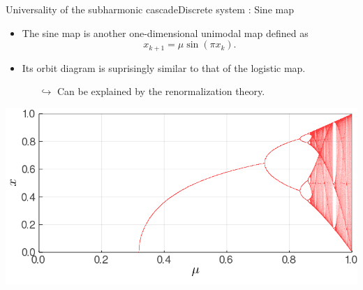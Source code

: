\documentclass[usenames,dvipsnames,svgnames,10pt,aspectratio=169]{beamer}
\begin{document}
\begin{frame}[t, c]{Universality of the subharmonic cascade}{Discrete system : Sine map}
	\begin{minipage}{.48\textwidth}
		\begin{itemize}
			\item The sine map is another one-dimensional unimodal map defined as
			\[
				x_{k+1} = \mu \sin \left( \pi x_k \right).
			\]

			\medskip

			\item Its orbit diagram is suprisingly similar to that of the logistic map.
			\begin{itemize}
				\item[\( \hookrightarrow \)] Can be explained by the renormalization theory.
			\end{itemize}
		\end{itemize}
	\end{minipage}%
	\hfill
	\begin{minipage}{.48\textwidth}
		\includegraphics[width=\textwidth]{sine_map_orbit_diagram}
	\end{minipage}

	\vspace{1cm}
\end{frame}
\end{document}
